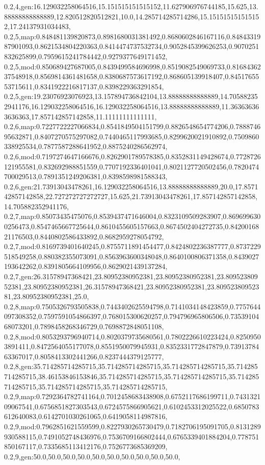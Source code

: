 0.2,4,gen:16.129032258064516,15.151515151515152,11.627906976744185,15.625,13.88888888888889,12.820512820512821,10.0,14.285714285714286,15.151515151515152,17.24137931034483,
0.2,5,map:0.848481139820873,0.8981680031381492,0.8680602846167116,0.8484331987901093,0.8621534804220363,0.8414474737532734,0.9052845399626253,0.9070251832625899,0.7959615241784442,0.9279377649171452,
0.2,5,mod:0.850689427687005,0.8439499584696998,0.8519082549069733,0.8168436237548918,0.8569814361481658,0.8380687573617192,0.868605139918407,0.8451765553715611,0.8341922216817137,0.8398229363291854,
0.2,5,gen:19.23076923076923,13.157894736842104,13.88888888888889,14.705882352941176,16.129032258064516,16.129032258064516,13.88888888888889,11.363636363636363,17.857142857142858,11.11111111111111,
0.2,6,map:0.7227722227066834,0.8541849504151799,0.8826548654774206,0.788874695632871,0.8407270575297082,0.7440465117993685,0.8299620021910892,0.7509860338925534,0.7877587288641952,0.8875240286562974,
0.2,6,mod:0.7197274647166676,0.8262901789578385,0.8352831149428674,0.7728726121955581,0.832692988851559,0.7707192336401041,0.8021127720502456,0.7820474700029513,0.7891351249206381,0.8398598981588343,
0.2,6,gen:21.73913043478261,16.129032258064516,13.88888888888889,20.0,17.857142857142858,22.727272727272727,15.625,21.73913043478261,17.857142857142858,14.705882352941176,
0.2,7,map:0.85073435475076,0.8539437471646004,0.8323109509283907,0.8696996300256473,0.8547465667725644,0.8610455605157663,0.8674502404272735,0.8420016821176503,0.8440802586433892,0.8682959278054792,
0.2,7,mod:0.8169739401640245,0.8755711891454477,0.8424802236387777,0.8737229518549258,0.880382355073091,0.8563963600348048,0.8640100806371358,0.8439027193642262,0.8391805664109956,0.8629021439137284,
0.2,7,gen:26.31578947368421,23.80952380952381,23.80952380952381,23.80952380952381,23.80952380952381,26.31578947368421,23.80952380952381,23.80952380952381,23.80952380952381,25.0,
0.2,8,map:0.7505326793505838,0.7443402625594798,0.7141034148423859,0.7757644097308352,0.7597591054866397,0.768015300620257,0.794796965806506,0.7353910468073201,0.7898458268346729,0.7698872848051108,
0.2,8,mod:0.8053293796940714,0.8020379735680561,0.7802226610223424,0.82509503891411,0.8472564055177078,0.8551950079945931,0.8352331772847879,0.7391378463367017,0.8058413302441266,0.8237444379125777,
0.2,8,gen:35.714285714285715,35.714285714285715,35.714285714285715,35.714285714285715,38.46153846153846,35.714285714285715,35.714285714285715,35.714285714285715,35.714285714285715,35.714285714285715,
0.2,9,map:0.7292364782741164,0.7012458683438908,0.6752117686199711,0.743132109067541,0.6756851827303543,0.6724575866905621,0.6102453312025522,0.6850783612640083,0.6142701030261065,0.6419058114987816,
0.2,9,mod:0.7962851621559599,0.8227930265730479,0.7182706195091705,0.8131289930588115,0.7491052748436976,0.7536709166802444,0.6765339401884204,0.778751850167117,0.7335685113412176,0.7526773685369209,
0.2,9,gen:50.0,50.0,50.0,50.0,50.0,50.0,50.0,50.0,50.0,50.0,
